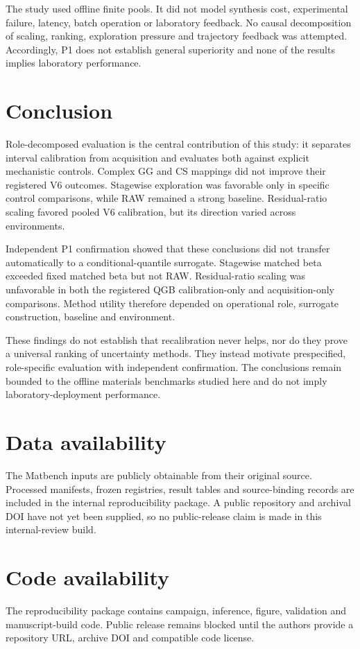 \documentclass[10pt]{article}
\begin{document}
The study used offline finite pools. It did not model synthesis cost, experimental failure, latency, batch operation or laboratory feedback. No causal decomposition of scaling, ranking, exploration pressure and trajectory feedback was attempted. Accordingly, P1 does not establish general superiority and none of the results implies laboratory performance.
\section{Conclusion}
Role-decomposed evaluation is the central contribution of this study: it separates interval calibration from acquisition and evaluates both against explicit mechanistic controls. Complex GG and CS mappings did not improve their registered V6 outcomes. Stagewise exploration was favorable only in specific control comparisons, while RAW remained a strong baseline. Residual-ratio scaling favored pooled V6 calibration, but its direction varied across environments.

Independent P1 confirmation showed that these conclusions did not transfer automatically to a conditional-quantile surrogate. Stagewise matched beta exceeded fixed matched beta but not RAW. Residual-ratio scaling was unfavorable in both the registered QGB calibration-only and acquisition-only comparisons. Method utility therefore depended on operational role, surrogate construction, baseline and environment.

These findings do not establish that recalibration never helps, nor do they prove a universal ranking of uncertainty methods. They instead motivate prespecified, role-specific evaluation with independent confirmation. The conclusions remain bounded to the offline materials benchmarks studied here and do not imply laboratory-deployment performance.
\section*{Data availability}
The Matbench inputs are publicly obtainable from their original source. Processed manifests, frozen registries, result tables and source-binding records are included in the internal reproducibility package. A public repository and archival DOI have not yet been supplied, so no public-release claim is made in this internal-review build.

\section*{Code availability}
The reproducibility package contains campaign, inference, figure, validation and manuscript-build code. Public release remains blocked until the authors provide a repository URL, archive DOI and compatible code license.
\end{document}

